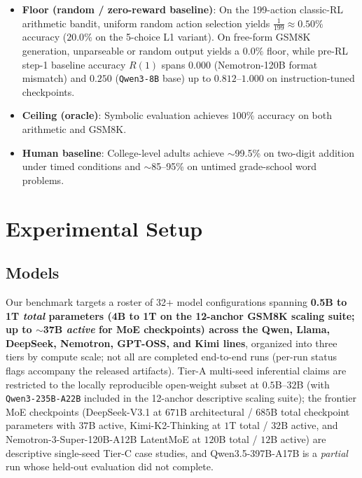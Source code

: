 \begin{itemize}
    \item \textbf{Floor (random / zero-reward baseline)}: On the 199-action classic-RL arithmetic bandit, uniform random action selection yields $\frac{1}{199} \approx 0.50\%$ accuracy ($20.0\%$ on the 5-choice L1 variant). On free-form GSM8K generation, unparseable or random output yields a $0.0\%$ floor, while pre-RL step-1 baseline accuracy $R(1)$ spans $0.000$ (Nemotron-120B format mismatch) and $0.250$ (\texttt{Qwen3-8B} base) up to $0.812$--$1.000$ on instruction-tuned checkpoints.
    \item \textbf{Ceiling (oracle)}: Symbolic evaluation achieves $100\%$ accuracy on both arithmetic and GSM8K.
    \item \textbf{Human baseline}: College-level adults achieve $\sim$99.5\% on
    two-digit addition under timed conditions and $\sim$85--95\% on untimed grade-school word problems.
\end{itemize}

\section{Experimental Setup}
\label{sec:setup}\label{sec:exp-design}

\subsection{Models}

Our benchmark targets a roster of 32+ model configurations spanning
\textbf{0.5B to 1T \emph{total} parameters (4B to 1T on the 12-anchor GSM8K scaling suite; up to $\sim$37B \emph{active}
for MoE checkpoints) across the Qwen, Llama, DeepSeek, Nemotron, GPT-OSS, and Kimi lines}, organized into three
tiers by compute scale; not all are completed end-to-end runs (per-run
status flags accompany the released artifacts). Tier-A multi-seed inferential claims are restricted to
the locally reproducible open-weight subset at $0.5$B--$32$B (with \texttt{Qwen3-235B-A22B} included in the 12-anchor descriptive scaling suite); the frontier MoE
checkpoints (DeepSeek-V3.1 at $671$B architectural / $685$B total checkpoint parameters with $37$B active, Kimi-K2-Thinking at $1$T total / $32$B active, and Nemotron-3-Super-120B-A12B LatentMoE at $120$B total / $12$B active) are
descriptive single-seed Tier-C case studies, and Qwen3.5-397B-A17B is a
\emph{partial} run whose held-out evaluation did not complete.

